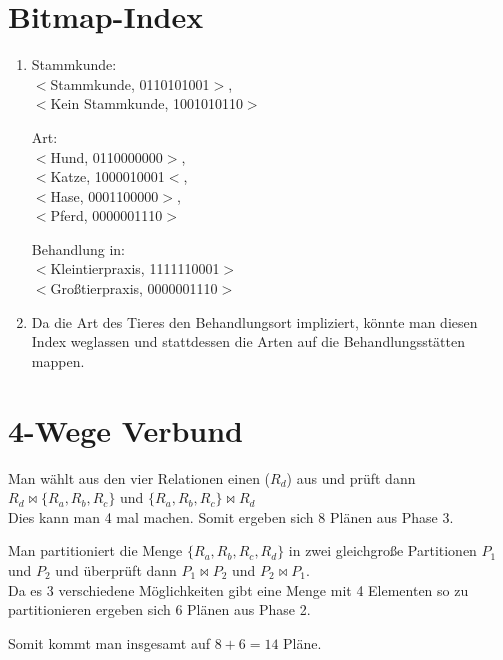 \documentclass{scrartcl}
\begin{document}
\section{Bitmap-Index}
\begin{enumerate}
    \item   Stammkunde:\\$<$Stammkunde, 0110101001$>$, \\$<$Kein Stammkunde, 1001010110$>$
    
            Art:\\$<$Hund, 0110000000$>$,\\$<$Katze, 1000010001$<$,\\$<$Hase, 0001100000$>$,\\$<$Pferd, 0000001110$>$
            
            Behandlung in:\\$<$Kleintierpraxis, 1111110001$>$\\$<$Großtierpraxis, 0000001110$>$
    \item Da die Art des Tieres den Behandlungsort impliziert, könnte man diesen Index weglassen und stattdessen die Arten auf die Behandlungsstätten mappen.
\end{enumerate}
\section{4-Wege Verbund}
Man wählt aus den vier Relationen einen ($R_d$) aus und prüft dann $R_d \bowtie \{R_a, R_b, R_c\}$ und $\{R_a, R_b, R_c\}\bowtie R_d$\\Dies kann man 4 mal machen. Somit ergeben sich 8 Plänen aus Phase 3.

Man partitioniert die Menge $\{R_a, R_b, R_c, R_d\}$ in zwei gleichgroße Partitionen $P_1$ und $P_2$ und überprüft dann $P_1 \bowtie P_2$ und $P_2 \bowtie P_1$.\\
Da es 3 verschiedene Möglichkeiten gibt eine Menge mit 4 Elementen so zu partitionieren ergeben sich 6 Plänen aus Phase 2.

Somit kommt man insgesamt auf $8+6=14$ Pläne.
\end{document}
